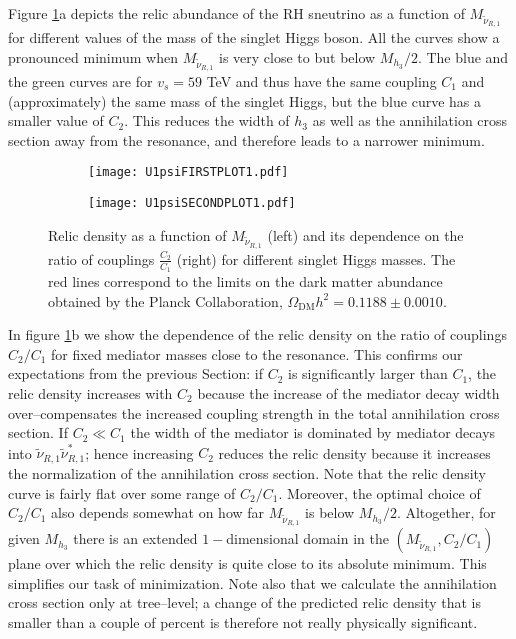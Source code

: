 \documentclass[a4paper,11pt]{article}
\begin{document}
Figure \ref{Fig3}a depicts the relic abundance of the RH sneutrino as
a function of $M_{\tilde{\nu}_{R,1}}$ for different values of the mass
of the singlet Higgs boson. All the curves show a pronounced minimum
when $M_{\tilde{\nu}_{R,1}}$ is very close to but below
$M_{h_{3}}/2$. The blue and the green curves are for $v_s = 59$ TeV
and thus have the same coupling $C_1$ and (approximately) the same
mass of the singlet Higgs, but the blue curve has a smaller value of
$C_2$. This reduces the width of $h_3$ as well as the annihilation
cross section away from the resonance, and therefore leads to a
narrower minimum.

\begin{figure}[h!]
\begin{subfigure}[b]{0.5\linewidth}
\centering\texttt{[image: U1psiFIRSTPLOT1.pdf]}
\caption{}
\end{subfigure}\hfill
\begin{subfigure}[b]{0.58\linewidth}
\centering\texttt{[image: U1psiSECONDPLOT1.pdf]}
\caption{}
\end{subfigure}   
\caption{Relic density as a function of
  $M_{\tilde{\nu}_{R,1}}$ (left) and its dependence on the ratio of
  couplings $\frac{C_{2}}{C_{1}}$ (right) for different singlet Higgs
  masses. The red lines correspond to the limits on the dark matter
  abundance obtained by the Planck Collaboration,
  $\Omega_{\text{DM}} h^2 = 0.1188\pm 0.0010$.
\label{Fig3}}
\end{figure}

In figure \ref{Fig3}b we show the dependence of the relic density on
the ratio of couplings $C_2 / C_1$ for fixed mediator masses close to
the resonance. This confirms our expectations from the previous
Section: if $C_2$ is significantly larger than $C_1$, the relic
density increases with $C_2$ because the increase of the mediator
decay width over--compensates the increased coupling strength in the
total annihilation cross section. If $C_{2}\ll C_{1}$ the width of the
mediator is dominated by mediator decays into
$\tilde \nu_{R,1} \tilde \nu^*_{R,1}$; hence increasing $C_2$ reduces
the relic density because it increases the normalization of the
annihilation cross section. Note that the relic density curve is
fairly flat over some range of $C_2 / C_1$. Moreover, the optimal
choice of $C_2/C_1$ also depends somewhat on how far
$M_{\tilde \nu_{R,1}}$ is below $M_{h_3}/2$. Altogether, for given
$M_{h_3}$ there is an extended $1-$dimensional domain in the
$(M_{\tilde \nu_{R,1}}, C_2/C_1)$ plane over which the relic density is
quite close to its absolute minimum. This simplifies our task of
minimization. Note also that we calculate the annihilation cross
section only at tree--level; a change of the predicted relic density
that is smaller than a couple of percent is therefore not really
physically significant.
\end{document}
